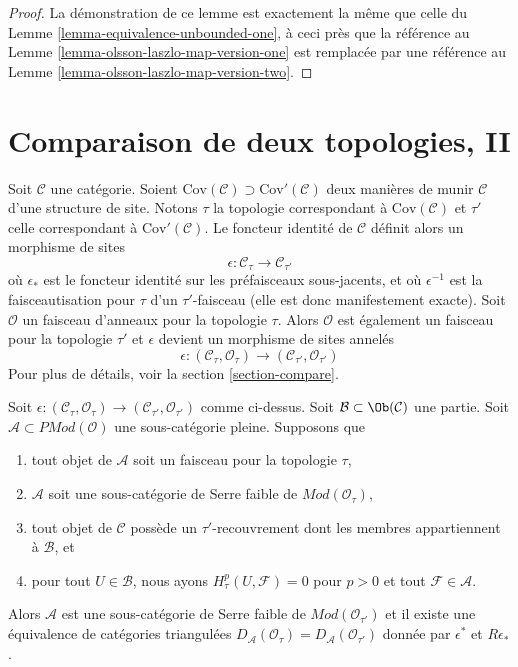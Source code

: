 \begin{proof}
La démonstration de ce lemme est exactement la même que celle du Lemme
\ref{lemma-equivalence-unbounded-one}, à ceci près que la référence au
Lemme \ref{lemma-olsson-laszlo-map-version-one} est remplacée par une
référence au Lemme \ref{lemma-olsson-laszlo-map-version-two}.
\end{proof}








\section{Comparaison de deux topologies, II}
\label{section-compare-II}

\noindent
Soit $\mathcal{C}$ une catégorie. Soient
$\text{Cov}(\mathcal{C}) \supset \text{Cov}'(\mathcal{C})$
deux manières de munir $\mathcal{C}$ d'une structure de site. Notons
$\tau$ la topologie correspondant à $\text{Cov}(\mathcal{C})$ et $\tau'$
celle correspondant à $\text{Cov}'(\mathcal{C})$. Le foncteur identité de
$\mathcal{C}$ définit alors un morphisme de sites
$$
\epsilon : \mathcal{C}_\tau \longrightarrow \mathcal{C}_{\tau'}
$$
où $\epsilon_*$ est le foncteur identité sur les préfaisceaux sous-jacents,
et où $\epsilon^{-1}$ est la faisceautisation pour $\tau$ d'un
$\tau'$-faisceau (elle est donc manifestement exacte). Soit
$\mathcal{O}$ un faisceau d'anneaux pour la topologie $\tau$. Alors
$\mathcal{O}$ est également un faisceau pour la topologie $\tau'$ et
$\epsilon$ devient un morphisme de sites annelés
$$
\epsilon :
(\mathcal{C}_\tau, \mathcal{O}_\tau)
\longrightarrow
(\mathcal{C}_{\tau'}, \mathcal{O}_{\tau'})
$$
Pour plus de détails, voir la section \ref{section-compare}.

\begin{lemma}
\label{lemma-compare-topologies-derived-adequate-modules}
Soit $\epsilon : (\mathcal{C}_\tau, \mathcal{O}_\tau) \to
(\mathcal{C}_{\tau'}, \mathcal{O}_{\tau'})$ comme ci-dessus. Soit
$\mathcal{B} \subset \Ob(\mathcal{C})$ une partie. Soit
$\mathcal{A} \subset \textit{PMod}(\mathcal{O})$ une sous-catégorie
pleine. Supposons que
\begin{enumerate}
\item tout objet de $\mathcal{A}$ soit un faisceau pour la topologie $\tau$,
\item $\mathcal{A}$ soit une sous-catégorie de Serre faible de
$\textit{Mod}(\mathcal{O}_\tau)$,
\item tout objet de $\mathcal{C}$ possède un $\tau'$-recouvrement dont les
membres appartiennent à $\mathcal{B}$, et
\item pour tout $U \in \mathcal{B}$, nous ayons
$H^p_\tau(U, \mathcal{F}) = 0$ pour $p > 0$ et tout
$\mathcal{F} \in \mathcal{A}$.
\end{enumerate}
Alors $\mathcal{A}$ est une sous-catégorie de Serre faible de
$\textit{Mod}(\mathcal{O}_{\tau'})$ et il existe une équivalence de
catégories triangulées
$D_\mathcal{A}(\mathcal{O}_\tau) = D_\mathcal{A}(\mathcal{O}_{\tau'})$
donnée par $\epsilon^*$ et $R\epsilon_*$.
\end{lemma}

